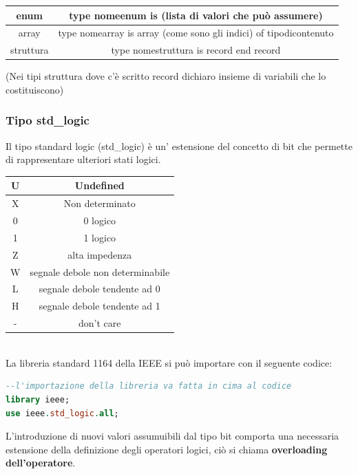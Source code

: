 \documentclass[a4paper]{book}
\begin{document}
\begin{itemize}
\begin{tabular}{|c|c|}
\hline
enum & type nomeenum is (lista di valori che può assumere)\\
\hline
array & type nomearray is array (come sono gli indici) of tipodicontenuto \\
\hline
struttura & type nomestruttura is record end record \\
\hline

\end{tabular}

(Nei tipi struttura dove c'è scritto record dichiaro insieme di variabili che lo costituiscono)

\end{itemize}


\subsubsection{Tipo std\_logic}

Il tipo standard logic (std\_logic) è un' estensione del concetto di bit che permette di rappresentare ulteriori stati logici.\vspace{\baselineskip}\\
\begin{tabular}{|c|c|}
\hline
U & Undefined \\
\hline
X & Non determinato \\
\hline
0 & 0 logico \\
\hline
1 & 1 logico \\
\hline
Z & alta impedenza \\
\hline
W & segnale debole non determinabile \\
\hline
L & segnale debole tendente ad 0 \\
\hline
H & segnale debole tendente ad 1 \\
\hline
- & don't care \\
\hline
\end{tabular}
\vspace{\baselineskip}\\
La libreria standard 1164 della IEEE si può importare con il seguente codice:

\begin{lstlisting}[language= VHDL]
--l'importazione della libreria va fatta in cima al codice
library ieee;
use ieee.std_logic.all;

\end{lstlisting}

L'introduzione di nuovi valori assumuibili dal tipo bit comporta una necessaria estensione della definizione degli operatori logici, ciò si chiama \textbf{overloading dell'operatore}.
\end{document}
